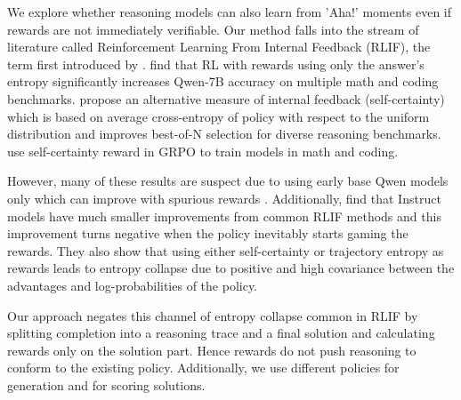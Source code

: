 \documentclass[12pt,a4paper]{article}
\begin{document}
We explore whether reasoning models can also learn from 'Aha!' moments even if rewards are not immediately verifiable. Our method falls into the stream of literature called Reinforcement Learning From Internal Feedback (RLIF), the term first introduced by \citet{zhao_learning_2026}. \citet{agarwal_unreasonable_2025} find that RL with rewards using only the answer's entropy significantly increases Qwen-7B accuracy on multiple math and coding benchmarks.  \citet{kang_scalable_2025} propose an alternative measure of internal feedback (self-certainty) which is based on average cross-entropy of policy with respect to the uniform distribution and improves best-of-N selection for diverse reasoning benchmarks. \citet{zhao_learning_2026} use self-certainty reward in GRPO to train models in math and coding. 

However, many of these results are suspect due to using early base Qwen models only which can improve with spurious rewards \citep{shao_spurious_2026}. Additionally, \citet{zhang_no_2025} find that Instruct models have much smaller improvements from common RLIF methods and this improvement turns negative when the policy inevitably starts gaming the rewards. They also show that using either self-certainty or trajectory entropy as rewards leads to entropy collapse due to positive and high covariance between the advantages and log-probabilities of the policy.


Our approach negates this channel of entropy collapse common in RLIF by splitting completion into a reasoning trace and a final solution and calculating rewards only on the solution part. Hence rewards do not push reasoning to conform to the existing policy. Additionally, we use different policies for generation and for scoring solutions.



\end{document}
